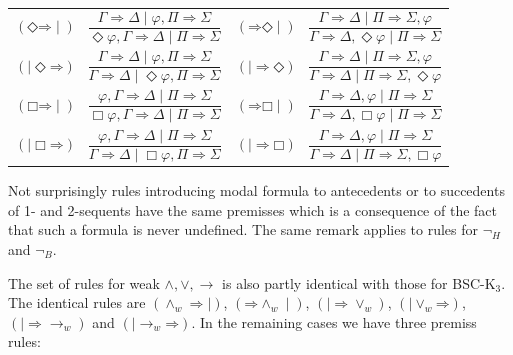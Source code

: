 \documentclass[11pt,a4paper,titlepage]{article}
\theoremstyle{definition}
\newcommand{\3}{\vspace{.3in}}
\newcommand{\2}{\vspace{.2in}}
\newcommand{\1}{\vspace{.1in}}
\newcommand{\5}{\vspace{.05in}}
\begin{document}
\1

\noindent\begin{tabular}{ll}

	$(\mathord{\Diamond}\mathord{\Rightarrow}\mid)$ \ $\dfrac{\Gamma
		\Rightarrow \Delta \mid \varphi, \Pi\Rightarrow\Sigma}{\Diamond \varphi, \Gamma \Rightarrow \Delta \mid \Pi\Rightarrow\Sigma}$ &
	$(\mathord{\Rightarrow}\mathord{\Diamond}\mid)$ \ $\dfrac{\Gamma
		\Rightarrow \Delta \mid \Pi\Rightarrow\Sigma, \varphi}{\Gamma
		\Rightarrow \Delta, \Diamond\varphi\mid \Pi\Rightarrow\Sigma}$\\[16pt]
	
	
	$(\mathord{\mid\Diamond}\mathord{\Rightarrow})$ \ $\dfrac{\Gamma
		\Rightarrow \Delta \mid \varphi, \Pi\Rightarrow\Sigma}{\Gamma
		\Rightarrow \Delta \mid \Diamond\varphi, \Pi\Rightarrow\Sigma}$ &
	$(\mathord{\mid\Rightarrow}\mathord{\Diamond})$ \ $\dfrac{\Gamma
		\Rightarrow \Delta \mid \Pi\Rightarrow\Sigma, \varphi}{\Gamma
		\Rightarrow \Delta \mid \Pi\Rightarrow\Sigma, \Diamond\varphi}$\\[16pt]
	
	$(\mathord{\Box}\mathord{\Rightarrow}\mid)$ \ $\dfrac{\varphi, \Gamma
		\Rightarrow \Delta \mid \Pi\Rightarrow\Sigma}{\Box\varphi, \Gamma \Rightarrow \Delta \mid \Pi\Rightarrow\Sigma}$ &
	$(\mathord{\Rightarrow}\mathord{\Box}\mid)$ \ $\dfrac{\Gamma
		\Rightarrow \Delta, \varphi \mid \Pi\Rightarrow\Sigma}{\Gamma
		\Rightarrow \Delta, \Box\varphi\mid \Pi\Rightarrow\Sigma}$\\[16pt]
	
	
	$(\mathord{\mid\Box}\mathord{\Rightarrow})$ \ $\dfrac{\varphi, \Gamma
		\Rightarrow \Delta \mid \Pi\Rightarrow\Sigma}{\Gamma
		\Rightarrow \Delta \mid \Box\varphi, \Pi\Rightarrow\Sigma}$ &
	$(\mathord{\mid\Rightarrow}\mathord{\Box})$ \ $\dfrac{\Gamma
		\Rightarrow \Delta, \varphi \mid \Pi\Rightarrow\Sigma}{\Gamma
		\Rightarrow \Delta \mid \Pi\Rightarrow\Sigma, \Box\varphi}$\\[16pt]
	
	
	
	
\end{tabular}	


Not surprisingly rules introducing modal formula to antecedents or to succedents of 1- and 2-sequents have the same premisses which is a consequence of the fact that such a formula is never undefined. The same remark applies to rules for $\neg_H$ and $\neg_B$.

\1

The set of rules for weak $\wedge, \vee, \rightarrow$ is also partly identical with those for BSC-K$_3$. The identical rules are $(\mathord{\wedge_w}\mathord{\Rightarrow\mid})$, $(\mathord{\Rightarrow}\mathord{\wedge_w\mid})$, $(\mathord{\mid\Rightarrow}\mathord{\vee_w})$, $(\mathord{\mid\vee_w}\mathord{\Rightarrow})$, $(\mathord{\mid\Rightarrow}\mathord{\rightarrow_w})$ and $(\mathord{\mid\rightarrow_w}\mathord{\Rightarrow})$. In the remaining cases we have three premiss rules:
\end{document}
